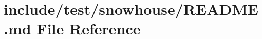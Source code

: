 \hypertarget{include_2test_2snowhouse_2README_8md}{}\section{include/test/snowhouse/\+R\+E\+A\+D\+ME.md File Reference}
\label{include_2test_2snowhouse_2README_8md}
